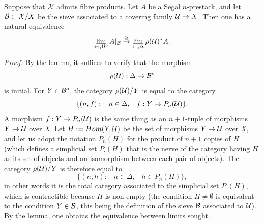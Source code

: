 \begin{corollary}
\label{limsurdelta}
Suppose that ${\cal X}$ admits fibre products.
Let $A$ be a Segal $n$-prestack, and let ${\cal B} \subset
{\cal X} /X$
be the sieve associated to a covering family ${\cal U} \rightarrow X$.
Then one has a natural equivalence
$$
\lim _{\leftarrow , {\cal B} ^o} A|_{{\cal B}} \stackrel{\cong}{\rightarrow}
\lim _{\leftarrow , \Delta  } \rho ({\cal U} )^{\ast}A.
$$
\end{corollary}
{\em Proof:}
By the lemma, it suffices to verify that the morphism
$$
\rho ({\cal U} ): \Delta \rightarrow {\cal B} ^o
$$
is initial. For $Y\in {\cal B} ^o$, the category $\rho ({\cal U} )/Y$
is equal to the category
$$
\{ (n,f): \;\;\; n\in \Delta , \;\;\; f: Y\rightarrow P_n({\cal U} )\} .
$$
A morphism $f: Y\rightarrow P_n({\cal U} )$ is the same thing as an
$n+1$-tuple of morphisms $Y\rightarrow {\cal U}$ over $X$. Let $H:= Hom
(Y,{\cal U} )$ be the set of morphisms $Y\rightarrow {\cal U}$ over $X$,
and let us adopt the notation $P_n(H)$ for the product
of $n+1$ copies of $H$ (which defines a
simplicial set $P_{\cdot}(H)$ that is the nerve of the
category having $H$
as its set of objects and an isomorphism between each pair of objects). The
category $\rho ({\cal U} )/Y$ is therefore equal to
$$
\{ (n,h): \;\;\; n\in \Delta , \;\;\; h\in P_n(H)\} ,
$$
in other words it is the total category associated to
the simplicial set
$P_{\cdot}(H)$,
which is contractible because $H$ is non-empty (the condition $H\neq \emptyset$
is equivalent to the condition $Y\in {\cal B}$, this being the definition of the
sieve ${\cal B}$ associated to ${\cal U}$). By the lemma, one obtains the equivalence
between limits sought.
\eop


